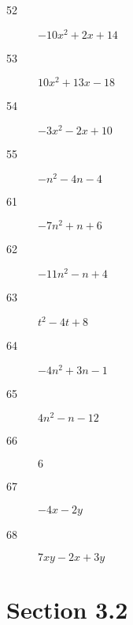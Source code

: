 \documentclass[letterpaper, landscape]{exam}
\begin{document}
\begin{description}
          \item[52] $-10x^2 + 2x + 14$

          \item[53] $10x^2 + 13x - 18$ 

          \item[54] $-3x^2 - 2x + 10$

          \item[55] $-n^2 -4n -4$

          \item[61] $-7n^2 + n + 6$

          \item[62] $-11n^2 - n + 4$

          \item[63] $t^2 - 4t + 8$

          \item[64] $-4n^2 + 3n - 1$

          \item[65] $4n^2 - n - 12$

          \item[66] $6$

          \item[67] $-4x - 2y$

          \item[68] $7xy - 2x + 3y$

      \end{description}

      \section{Section 3.2}
\end{document}
